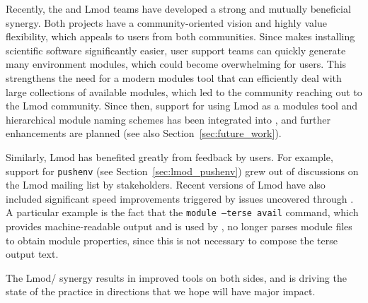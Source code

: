 Recently, the \easybuild{} and Lmod teams have developed
a strong and mutually beneficial synergy. Both projects have a
community-oriented vision and highly value flexibility, which appeals to users
from both communities. Since \easybuild{} makes installing scientific software
significantly easier, user support teams can quickly generate many environment
modules, which could become overwhelming for users. This strengthens the need for a
modern modules tool that can efficiently deal with large collections of available
modules, which led to the \easybuild{} community reaching out to the Lmod community.
Since then, support for using Lmod as a modules tool and  hierarchical
module naming schemes has been integrated into \easybuild{}, and further
enhancements are planned (see also Section~\ref{sec:future_work}).

Similarly, Lmod has benefited greatly from feedback by \easybuild{} users.
For example, support for \texttt{pushenv} (see
Section~\ref{sec:lmod_pushenv}) grew out of discussions on the Lmod
mailing list by \easybuild{} stakeholders. Recent versions of Lmod
have also included significant speed improvements triggered by issues
uncovered through \easybuild{}. A particular example is the fact that
the \texttt{module --terse avail} command, which provides machine-readable output and
is used by \easybuild{}, no longer parses module files to obtain module properties,
since this is not necessary to compose the terse output text.

The Lmod/\easybuild{} synergy results in improved tools on both sides,
and is driving the state of the practice in directions that we hope will
have major impact.
